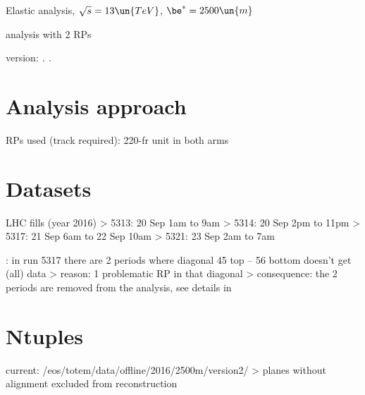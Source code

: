

\def\baseDir{/afs/cern.ch/work/j/jkaspar/analyses/elastic/6500GeV/beta2500/2rp/}


\hbox{}
\vskip-10mm

\centerline{\SetFontSizesXX Elastic analysis, $\sqrt s = 13\un{TeV}$, $\be^* = 2500\un{m}$}
\vskip2mm
\centerline{\SetFontSizesXX analysis with 2 RPs }
\vskip2mm
\centerline{version: {\it \number\day. \number\month. \number\year}}

\vfil
\InsertToc

\vfil
\eject

\BeginText

\chapter{Analysis approach}

\> RPs used (track required): 220-fr unit in both arms



\chapter{Datasets}

\> LHC fills (year 2016)
\>> 5313: 20 Sep 1am to 9am
\>> 5314: 20 Sep 2pm to 11pm
\>> 5317: 21 Sep 6am to 22 Sep  10am
\>> 5321: 23 Sep 2am to 7am

\> : in run 5317 there are 2 periods where diagonal 45 top -- 56 bottom doesn't get (all) data
\>> reason: 1 problematic RP in that diagonal
\>> consequence: the 2 periods are removed from the analysis, see details in\\ 



\chapter{Ntuples}

\> current: /eos/totem/data/offline/2016/2500m/version2/
\>> planes without alignment excluded from reconstruction

